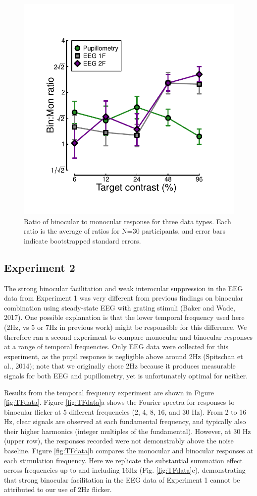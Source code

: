 \documentclass[
]{article}
\begin{document}
\begin{figure}

{\centering \includegraphics[width=0.5\linewidth]{Figures/BSratios} 

}

\caption{Ratio of binocular to monocular response for three data types. Each ratio is the average of ratios for N=30 participants, and error bars indicate bootstrapped standard errors.}\label{fig:BSratios}
\end{figure}

\hypertarget{experiment-2}{%
\subsection{Experiment 2}\label{experiment-2}}

The strong binocular facilitation and weak interocular suppression in the EEG data from Experiment 1 was very different from previous findings on binocular combination using steady-state EEG with grating stimuli (Baker and Wade, 2017). One possible explanation is that the lower temporal frequency used here (2Hz, vs 5 or 7Hz in previous work) might be responsible for this difference. We therefore ran a second experiment to compare monocular and binocular responses at a range of temporal frequencies. Only EEG data were collected for this experiment, as the pupil response is negligible above around 2Hz (Spitschan et al., 2014); note that we originally chose 2Hz because it produces measurable signals for both EEG and pupillometry, yet is unfortunately optimal for neither.

Results from the temporal frequency experiment are shown in Figure \ref{fig:TFdata}. Figure \ref{fig:TFdata}a shows the Fourier spectra for responses to binocular flicker at 5 different frequencies (2, 4, 8, 16, and 30 Hz). From 2 to 16 Hz, clear signals are observed at each fundamental frequency, and typically also their higher harmonics (integer multiples of the fundamental). However, at 30 Hz (upper row), the responses recorded were not demonstrably above the noise baseline. Figure \ref{fig:TFdata}b compares the monocular and binocular responses at each stimulation frequency. Here we replicate the substantial summation effect across frequencies up to and including 16Hz (Fig. \ref{fig:TFdata}c), demonstrating that strong binocular facilitation in the EEG data of Experiment 1 cannot be attributed to our use of 2Hz flicker.
\end{document}
